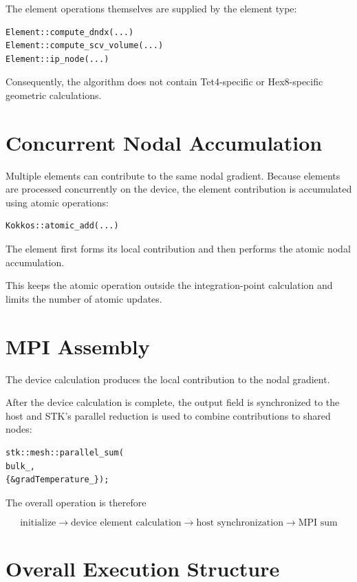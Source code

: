 \documentclass[11pt]{article}
\begin{document}
The element operations themselves are supplied by the element type:

\begin{verbatim}
Element::compute_dndx(...)
Element::compute_scv_volume(...)
Element::ip_node(...)
\end{verbatim}

Consequently, the algorithm does not contain Tet4-specific or
Hex8-specific geometric calculations.

\section{Concurrent Nodal Accumulation}

Multiple elements can contribute to the same nodal gradient.
Because elements are processed concurrently on the device, the
element contribution is accumulated using atomic operations:

\begin{verbatim}
Kokkos::atomic_add(...)
\end{verbatim}

The element first forms its local contribution and then performs
the atomic nodal accumulation.

This keeps the atomic operation outside the integration-point
calculation and limits the number of atomic updates.

\section{MPI Assembly}

The device calculation produces the local contribution to the
nodal gradient.

After the device calculation is complete, the output field is
synchronized to the host and STK's parallel reduction is used to
combine contributions to shared nodes:

\begin{verbatim}
stk::mesh::parallel_sum(
bulk_,
{&gradTemperature_});
\end{verbatim}

The overall operation is therefore

$$
\boxed{
\text{initialize}
\rightarrow
\text{device element calculation}
\rightarrow
\text{host synchronization}
\rightarrow
\text{MPI sum}
}
$$

\section{Overall Execution Structure}
\end{document}
